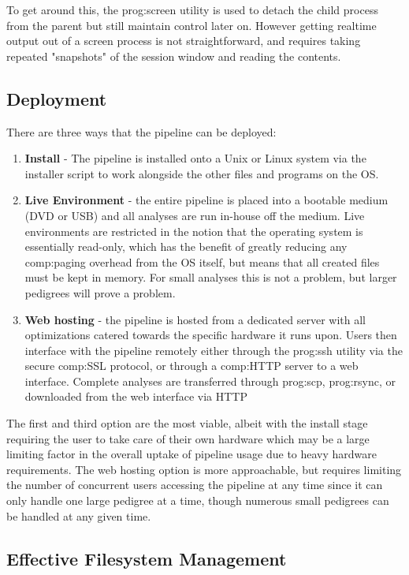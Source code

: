 To get around this, the \gls{prog:screen} utility is used to detach the child process from the parent but still maintain control later on. However getting realtime output out of a screen process is not straightforward, and requires taking repeated "snapshots" of the session window and reading the contents.


\subsection{Deployment}

There are three ways that the pipeline can be deployed:
\begin{enumerate}
\item{{\bf Install} - The pipeline is installed onto a Unix or Linux system via the installer script to work alongside the other files and programs on the OS.}
\item{{\bf Live Environment} - the entire pipeline is placed into a bootable medium (DVD or USB) and all analyses are run in-house off the medium. Live environments are restricted in the notion that the operating system is essentially read-only, which has the benefit of greatly reducing any \gls{comp:paging} overhead from the OS itself, but means that all created files must be kept in memory. For small analyses this is not a problem, but larger pedigrees will prove a problem.}
\item{{\bf Web hosting} - the pipeline is hosted from a dedicated server with all optimizations catered towards the specific hardware it runs upon. Users then interface with the pipeline remotely either through the \gls{prog:ssh} utility via the secure \gls{comp:SSL} protocol, or through a \gls{comp:HTTP} server to a web interface. Complete analyses are transferred through \gls{prog:scp}, \gls{prog:rsync}, or downloaded from the web interface via HTTP }
\end{enumerate}

The first and third option are the most viable, albeit with the install stage requiring the user to take care of their own hardware which may be a large limiting factor in the overall uptake of pipeline usage due to heavy hardware requirements. The web hosting option is more approachable, but requires limiting the number of concurrent users accessing the pipeline at any time since it can only handle one large pedigree at a time, though numerous small pedigrees can be handled at any given time.



\subsection{Effective Filesystem Management}

